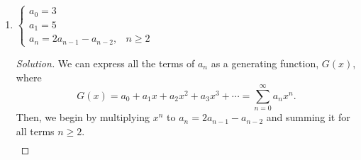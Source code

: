 \documentclass{article}
\newenvironment{solution}
  {\renewcommand\qedsymbol{$\blacksquare$}\begin{proof}[Solution]}
  {\end{proof}}
\begin{document}
\begin{enumerate}
{\begin{minipage}[t]{0.98\textwidth}
\begin{proof}
            We proceed by strong induction\footnote{We use strong induction because this is a second-order recurrence, so we need to assume $P(n-2)$ is true and not just $P(n-1)$. If it were just a first-order one, we could get away with
            just plain, ordinary induction.} on $n$. Let $P(n)$ be \[a_n = 3^{n+1} + {(-1)}^n,~\forall n \in \mathbb{N}.\] 
            \textbf{Base Case.} If $n=0$, then we have $3^1 + 1 = 4$. If $n=1$, then we have $3^2 -1 = 8$.\par 
            \textbf{Inductive Step.} Assume that $P(n-1)$ and $P(n-2)$ are true, by strong induction.\begin{align*} 
                a_n &= 2a_{n-1} + 3a_{n-2},~n \geq 2 &\text{by definition} \\
                &= 2\big(3^{n-1+1} + {(-1)}^{n-1}\big) + 3\big(3^{n-2+1} + {(-1)}^{n-2}\big) &\text{by the inductive hypothesis} \\ 
                &= 2\big(3^{n} + {(-1)}^{n-1}\big) + 3\big(3^{n-1} + {(-1)}^{n-2}\big) \\
                &= 2\cdot 3^n + 2\cdot {(-1)}^{n-1} + 3^n + 3{(-1)}^{n-2} \\
                &= 2\cdot 3^n + 3^n + 2\cdot {(-1)}^{n-1} + 3{(-1)}^{n-2} \\ 
                &= 3\cdot 3^n + 2 \cdot (-1) \cdot {(-1)}^{n-2} + 3{(-1)}^{n-2} \\ 
                &= 3^{n+1} + {(-1)}^{n-2}
                \intertext{We can see that if $n$ is even, then $n-2$ is even. This is also true if $n$ is odd. Thus, ${(-1)}^{n-2} = {(-1)}^n$. }
                &= 3^{n+1} + {(-1)}^n.
            \end{align*} Therefore, by strong induction, $a_n = 3^{n+1} + {(-1)}^n,~\forall n \in \mathbb{N}$.
        \end{proof} 
    \end{minipage}%
    }
    \item $\begin{cases} a_0 = 3 & \\ a_1 = 5 & \\ a_n = 2a_{n-1} - a_{n-2}, & n\geq 2\end{cases}$\begin{solution} 
        We can express all the terms of $a_n$ as a generating function, $G(x)$, where \[
            G(x) = a_0 + a_1 x + a_2 x^2 + a_3 x^3 + \cdots = \displaystyle{} \sum_{n=0}^\infty a_n x^n .
        \] Then, we begin by multiplying $x^n$ to $a_n = 2a_{n-1} - a_{n-2}$ and summing it for all terms $n\geq 2$.\begin{align*} 

\end{align*}
\end{solution}
\end{enumerate}
\end{document}
